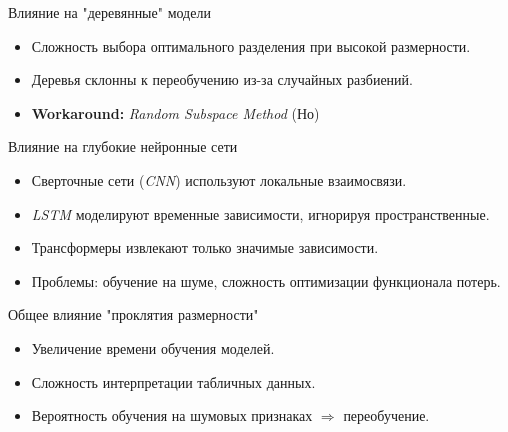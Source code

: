 \begin{frame}{Влияние на "деревянные" модели}
    \begin{itemize}
        \item Сложность выбора оптимального разделения при высокой размерности.
        \item Деревья склонны к переобучению из-за случайных разбиений.
        \item \textbf{Workaround:} \textit{Random Subspace Method} (Но)
    \end{itemize}
\end{frame}

\begin{frame}{Влияние на глубокие нейронные сети}
    \begin{itemize}
        \item Сверточные сети (\textit{CNN}) используют локальные взаимосвязи.
        \item \textit{LSTM} моделируют временные зависимости, игнорируя пространственные.
        \item Трансформеры извлекают только значимые зависимости.
        \item Проблемы: обучение на шуме, сложность оптимизации функционала потерь.
    \end{itemize}
\end{frame}

\begin{frame}{Общее влияние "проклятия размерности"}
    \begin{itemize}
        \item Увеличение времени обучения моделей.
        \item Сложность интерпретации табличных данных.
        \item Вероятность обучения на шумовых признаках \(\Rightarrow\) переобучение.
    \end{itemize}
\end{frame}